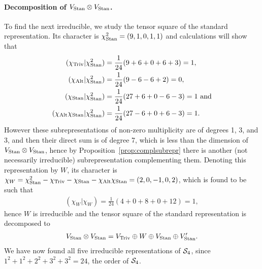 {\begin{example}
	\paragraph{Decomposition of $V_{\text{Stan}} \otimes V_{\text{Stan}}$.} To find the next irreducible, we study the tensor square of the standard representation. Its character is $\chi_{\text{Stan}}^2 = (9,1,0,1,1)$ and calculations will show that
	\begin{align*}
		(\chi_{\text{Triv}} | \chi_{\text{Stan}}^2) & = \frac{1}{24}(9 + 6 + 0 + 6 + 3) = 1, \\
		(\chi_{\text{Alt}} | \chi_{\text{Stan}}^2)  &= \frac{1}{24}(9-6-6+2) = 0, \\
		(\chi_{\text{Stan}} | \chi_{\text{Stan}}^2)  &= \frac{1}{24}(27+6+0-6-3) = 1 \text{ and} \\
		(\chi_{\text{Alt}}\chi_{\text{Stan}} | \chi_{\text{Stan}}^2)  &= \frac{1}{24}(27-6+0+6-3) = 1.
	\end{align*}
	However these subrepresentations of non-zero multiplicity are of degrees 1, 3, and 3, and then their direct sum is of degree 7, which is less than the dimension of $V_{\text{Stan}} \otimes V_{\text{Stan}}$, hence by Proposition~\ref{prop:complsubrepr} there is another (not necessarily irreducible) subrepresentation complementing them. Denoting this representation by $W$, its character is $\chi_W = \chi_{\text{Stan}}^2 - \chi_{\text{Triv}} - \chi_{\text{Stan}} - \chi_{\text{Alt}}\chi_{\text{Stan}} = (2,0,-1,0,2)$, which is found to be such that 
	\begin{align*}
		(\chi_W|\chi_W) = \frac{1}{24}(4 + 0 + 8 + 0 + 12) = 1,
	\end{align*}
	hence $W$ is irreducible and the tensor square of the standard representation is decomposed to 
	\begin{align*}
		V_{\text{Stan}} \otimes V_{\text{Stan}} = V_{\text{Triv}} \oplus W \oplus V_{\text{Stan}} \oplus V'_{\text{Stan}}.
	\end{align*}
	We have now found all five irreducible representations of $\mathcal{S}_4$, since $1^2 + 1^2 +  2^2 + 3^2 + 3^2 = 24$, the order of $\mathcal{S}_4$.

\end{example}}
